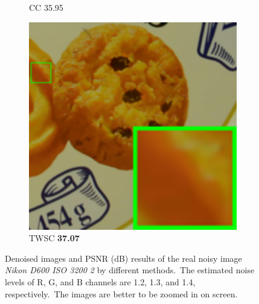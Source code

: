 \begin{figure}
\begin{subfigure}[t]{0.19\textwidth}
		\caption{CC 35.95}
    \end{subfigure}
    \hfill
    \begin{subfigure}[t]{0.19\textwidth}
        \centering
        \includegraphics[width=1\textwidth]{images/twsc/cc/resize_br_TWSC_d600_iso3200_2.png}
		\caption{TWSC \textbf{37.07}}
    \end{subfigure}
    \caption{Denoised images and PSNR (dB) results of the real noisy image \textsl{Nikon D600 ISO 3200 2} \cite{crosschannel2016} by different methods.\ The estimated noise levels of R, G, and B channels are 1.2, 1.3, and 1.4, respectively.\ The images are better to be zoomed in on screen.}
    \label{fig3}
\end{figure}


